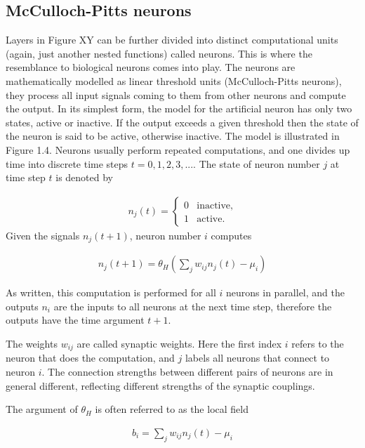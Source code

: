 \subsection{McCulloch-Pitts neurons}

Layers in Figure XY can be further divided into distinct computational units (again, just another nested functions) called neurons. This is where the resemblance to biological neurons comes into play. The neurons are mathematically modelled as linear threshold units (McCulloch-Pitts neurons), they process all input signals coming to them from other neurons and compute the output. In its simplest form, the model for the artificial neuron has only two states, active or inactive. If the output exceeds a given threshold then the state of the neuron is said to be active, otherwise inactive. The model is illustrated in Figure 1.4. Neurons usually perform repeated computations, and one divides up time into discrete time steps $ t = 0,1,2,3,.... $ The state of neuron number $ j $ at time step $ t $ is denoted by

\begin{gather}
n_j(t) = 
	\begin{cases}	
		0 & \text{inactive,}\\
		1 & \text{active.}
	\end{cases} 
\end{gather}
\noindent Given the signals $ n_j(t+1) $, neuron number $ i $ computes

\begin{gather}
n_j(t+1)=\theta_H \left(\sum\limits_{j}w_{ij}n_j(t) - \mu_i \right)
\end{gather}

As written, this computation is performed for all $ i $ neurons in parallel, and the outputs $ n_i $ are the inputs to all neurons at the next time step, therefore the outputs have the time argument $ t+1 $.

The weights $ w_{ij} $ are called synaptic weights. Here the first index $ i $
refers to the neuron that does the computation, and $ j $ labels all neurons that connect
to neuron $ i $. The connection strengths between different pairs of neurons are in
general different, reflecting different strengths of the synaptic couplings.

The argument of $ \theta_H $ is often referred to as the local field

\begin{gather}
b_i = \sum\limits_{j}w_{ij}n_j(t) - \mu_i
\end{gather}

